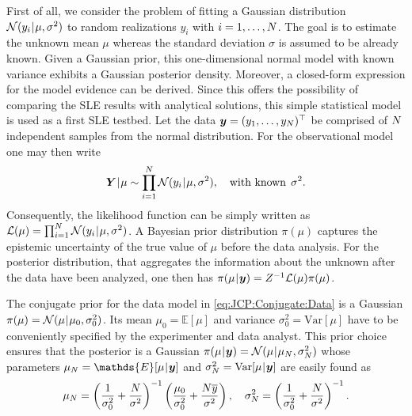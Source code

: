 First of all, we consider the problem of fitting a Gaussian distribution \(\mathcal{N}(y_i {\:\!}|{\:\!} \mu,\sigma^2)\) to random realizations \(y_i\) with \(i = 1,\ldots,N\).
The goal is to estimate the unknown mean \(\mu\) whereas the standard deviation \(\sigma\) is assumed to be already known.
Given a Gaussian prior, this one-dimensional normal model with known variance exhibits a Gaussian posterior density.
Moreover, a closed-form expression for the model evidence can be derived.
Since this offers the possibility of comparing the SLE results with analytical solutions, this simple statistical model is used as a first SLE testbed.
Let the data \(\bm{y} = (y_1,\ldots,y_N)^\top\) be comprised of \(N\) independent samples from the normal distribution.
For the observational model one may then write
\begin{equation} \label{eq:JCP:Conjugate:Data}
  \bm{Y} {\:\!}|{\:\!} \mu \sim \prod\limits_{i=1}^N \mathcal{N}(y_i {\:\!}|{\:\!} \mu,\sigma^2), \quad \text{with known} \;\, \sigma^2.
\end{equation}
Consequently, the likelihood function can be simply written as \(\mathcal{L}(\mu) = \prod_{i=1}^{N} \mathcal{N}(y_i {\:\!}|{\:\!} \mu,\sigma^2)\).
A Bayesian prior distribution \(\pi(\mu)\) captures the epistemic uncertainty of the true value of \(\mu\) before the data analysis.
For the posterior distribution, that aggregates the information about the unknown after the data have been analyzed, one then has \(\pi(\mu {\:\!}|{\:\!} \bm{y}) = Z^{-1} \mathcal{L}(\mu) \pi(\mu)\).
\par %
The conjugate prior for the data model in \cref{eq:JCP:Conjugate:Data} is a Gaussian \(\pi(\mu) = \mathcal{N}(\mu {\:\!}|{\:\!} \mu_0,\sigma_0^2)\).
Its mean \(\mu_0 = \mathds{E}[\mu]\) and variance \(\sigma_0^2 = \mathrm{Var}[\mu]\) have to be conveniently specified by the experimenter and data analyst.
This prior choice ensures that the posterior is a Gaussian \(\pi(\mu {\:\!}|{\:\!} \bm{y}) = \mathcal{N}(\mu {\:\!}|{\:\!} \mu_N,\sigma_N^2)\)
whose parameters \(\mu_\dimData = \mathds{E}[\mu \cond \bm{y}]\) and \(\sigma_N^2 = \mathrm{Var}[\mu {\:\!}|{\:\!} \bm{y}]\) are easily found as
\begin{equation} \label{eq:JCP:Conjugate:Posterior}
  \mu_N = \left( \frac{1}{\sigma_0^2} + \frac{N}{\sigma^2} \right)^{-1} \left( \frac{\mu_0}{\sigma_0^2} + \frac{N \overline{y}}{\sigma^2} \right),
  \quad \sigma_N^2 = \left( \frac{1}{\sigma_0^2} + \frac{N}{\sigma^2} \right)^{-1}.
\end{equation}
